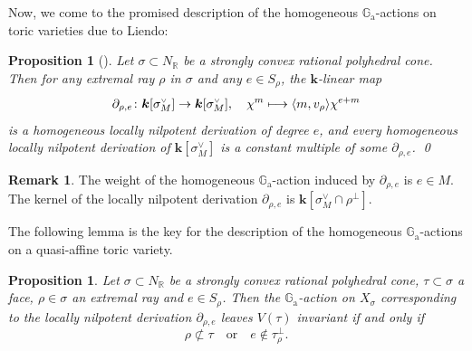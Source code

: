 \documentclass[11pt]{article}
\numberwithin{equation}{section}
\def\mto{\mathchoice{\longmapsto}{\mapsto}{\mapsto}{\mapsto}}
\newcommand{\ra}{\mathrm{a}}
\let\oldvee\vee
\renewcommand{\vee}{{\scriptscriptstyle\oldvee}}
\let\oldbot\bot
\renewcommand{\bot}{{\scriptscriptstyle\oldbot}}
\theoremstyle{plain}
\newtheorem{proposition}[theorem]{Proposition}
\theoremstyle{definition}
\newtheorem{remark}[theorem]{Remark}
\newcommand{\GG}{\mathbb{G}}
\newcommand{\RR}{\mathbb{R}}
\newcommand{\kk}{{\boldsymbol{k}}}
\newcommand{\name}[1]{#1}
\begin{document}
Now, we come to the promised description
of the homogeneous $\GG_\ra$-actions on toric varieties due to \name{Liendo}:

\begin{proposition}[{\cite[Lem.\,2.6, Th.\,2.7]{Li2010Affine-Bbb-T-varie}}]
\label{prop.G_a-actions_on_affine_toric_var}
Let $\sigma \subset N_\RR$ be a strongly convex rational polyhedral cone.
Then for any extremal ray $\rho$ in $\sigma$ and any
$e \in S_\rho$, the $\kk$-linear map
\[
\partial_{\rho, e} \colon \kk[\sigma^\vee_M] \to \kk[\sigma^\vee_M]
, \quad
\chi^m \mto \langle m, v_\rho \rangle \chi^{e+m}
\]
is a homogeneous locally nilpotent derivation of degree $e$,
and every homogeneous locally nilpotent derivation of $\kk[\sigma^\vee_M]$
is a constant multiple of some $\partial_{\rho, e}$. \qed
\end{proposition}

\begin{remark}
The weight of the homogeneous $\GG_\ra$-action induced by $\partial_{\rho, e}$ is $e \in M$.
The kernel of the locally nilpotent derivation $\partial_{\rho, e}$ is $\kk[\sigma_M^\vee \cap \rho^\bot]$.
\end{remark}

The following lemma is the key for the description of the homogeneous $\GG_\ra$-actions on a
quasi-affine toric variety.

\begin{proposition}
\label{Prop:Orbit_closure_invariant}
Let $\sigma \subset N_{\RR}$ be a strongly convex rational polyhedral cone, $\tau \subset \sigma$ a face,
$\rho \in \sigma$ an extremal ray and $e \in S_\rho$. Then the
$\GG_\ra$-action on $X_\sigma$ corresponding to the locally nilpotent derivation $\partial_{\rho, e}$
leaves $V(\tau)$ invariant if and only if
\[
\rho \not\subset \tau \quad \textrm{or} \quad e \not\in \tau_{\rho}^\bot.
\]
\end{proposition}
\end{document}
